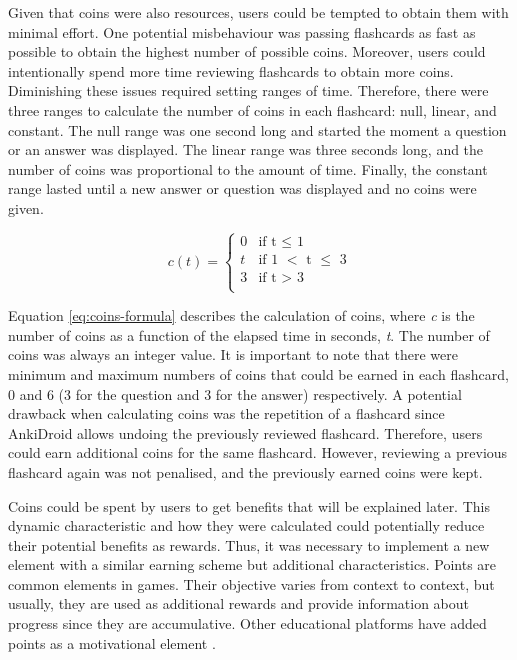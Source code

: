 Given that coins were also resources, users could be tempted to obtain them with minimal effort. One potential misbehaviour was passing flashcards as fast as possible to obtain the highest number of possible coins. Moreover, users could intentionally spend more time reviewing flashcards to obtain more coins. Diminishing these issues required setting ranges of time. Therefore, there were three ranges to calculate the number of coins in each flashcard: null, linear, and constant. The null range was one second long and started the moment a question or an answer was displayed. The linear range was three seconds long, and the number of coins was proportional to the amount of time. Finally, the constant range lasted until a new answer or question was displayed and no coins were given.

\begin{equation}
  c(t) =
      \begin{cases}
        0 & \text{if t $\leq$ 1}\\
        t & \text{if 1 $<$ t $\leq$ 3}\\
        3 & \text{if t $>$ 3}\\
      \end{cases}
    \label{eq:coins-formula}
\end{equation}

Equation \ref{eq:coins-formula} describes the calculation of coins, where \textit{c} is the number of coins as a function of the elapsed time in seconds, \textit{t}. The number of coins was always an integer value. It is important to note that there were minimum and maximum numbers of coins that could be earned in each flashcard, 0 and 6 (3 for the question and 3 for the answer) respectively. A potential drawback when calculating coins was the repetition of a flashcard since AnkiDroid allows undoing the previously reviewed flashcard. Therefore, users could earn additional coins for the same flashcard. However, reviewing a previous flashcard again was not penalised, and the previously earned coins were kept.

Coins could be spent by users to get benefits that will be explained later. This dynamic characteristic and how they were calculated could potentially reduce their potential benefits as rewards. Thus, it was necessary to implement a new element with a similar earning scheme but additional characteristics. Points are common elements in games. Their objective varies from context to context, but usually, they are used as additional rewards and provide information about progress since they are accumulative. Other educational platforms have added points as a motivational element \citep{disalvo2014khan}.

